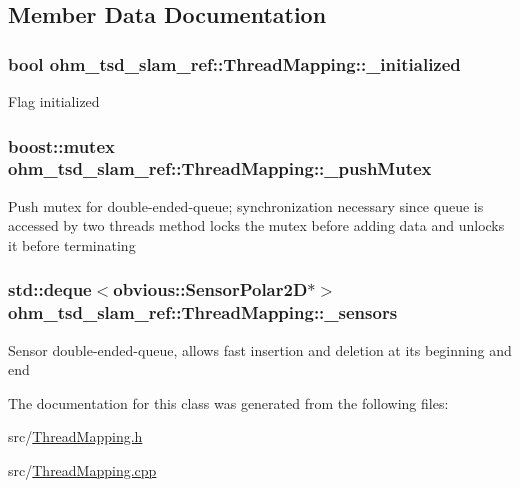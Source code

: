 \subsection{Member Data Documentation}
\hypertarget{classohm__tsd__slam__ref_1_1ThreadMapping_a450952216cdda4e4a7b57d899429291c}{
\subsubsection[{\-\_\-initialized}]{\setlength{\rightskip}{0pt plus 5cm}bool ohm\-\_\-tsd\-\_\-slam\-\_\-ref\-::\-Thread\-Mapping\-::\-\_\-initialized\hspace{0.3cm}{\ttfamily [private]}}}\label{classohm__tsd__slam__ref_1_1ThreadMapping_a450952216cdda4e4a7b57d899429291c}
Flag initialized \hypertarget{classohm__tsd__slam__ref_1_1ThreadMapping_a7c2899e1dd044dd21a98db7cf8b38a9d}{
\subsubsection[{\-\_\-push\-Mutex}]{\setlength{\rightskip}{0pt plus 5cm}boost\-::mutex ohm\-\_\-tsd\-\_\-slam\-\_\-ref\-::\-Thread\-Mapping\-::\-\_\-push\-Mutex\hspace{0.3cm}{\ttfamily [private]}}}\label{classohm__tsd__slam__ref_1_1ThreadMapping_a7c2899e1dd044dd21a98db7cf8b38a9d}
Push mutex for double-\/ended-\/queue; synchronization necessary since queue is accessed by two threads method locks the mutex before adding data and unlocks it before terminating \hypertarget{classohm__tsd__slam__ref_1_1ThreadMapping_a789f75baff077164a69bb62b479c593d}{
\subsubsection[{\-\_\-sensors}]{\setlength{\rightskip}{0pt plus 5cm}std\-::deque$<$obvious\-::\-Sensor\-Polar2\-D$\ast$$>$ ohm\-\_\-tsd\-\_\-slam\-\_\-ref\-::\-Thread\-Mapping\-::\-\_\-sensors\hspace{0.3cm}{\ttfamily [private]}}}\label{classohm__tsd__slam__ref_1_1ThreadMapping_a789f75baff077164a69bb62b479c593d}
Sensor double-\/ended-\/queue, allows fast insertion and deletion at its beginning and end 

The documentation for this class was generated from the following files\-:\begin{DoxyCompactItemize}
\item 
src/\hyperlink{ThreadMapping_8h}{Thread\-Mapping.\-h}\item 
src/\hyperlink{ThreadMapping_8cpp}{Thread\-Mapping.\-cpp}\end{DoxyCompactItemize}
